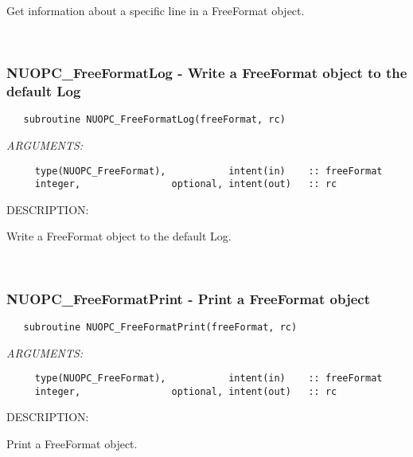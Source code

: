      Get information about a specific line in a FreeFormat object. 
 
\mbox{}\hrulefill\ 
 
\subsubsection [NUOPC\_FreeFormatLog] {NUOPC\_FreeFormatLog - Write a FreeFormat object to the default Log}


\begin{verbatim}   subroutine NUOPC_FreeFormatLog(freeFormat, rc)\end{verbatim}{\em ARGUMENTS:}
\begin{verbatim}     type(NUOPC_FreeFormat),           intent(in)    :: freeFormat
     integer,                optional, intent(out)   :: rc\end{verbatim}
{\sf DESCRIPTION:\\ }


     Write a FreeFormat object to the default Log. 
 
\mbox{}\hrulefill\ 
 
\subsubsection [NUOPC\_FreeFormatPrint] {NUOPC\_FreeFormatPrint - Print a FreeFormat object}


\begin{verbatim}   subroutine NUOPC_FreeFormatPrint(freeFormat, rc)\end{verbatim}{\em ARGUMENTS:}
\begin{verbatim}     type(NUOPC_FreeFormat),           intent(in)    :: freeFormat
     integer,                optional, intent(out)   :: rc\end{verbatim}
{\sf DESCRIPTION:\\ }


     Print a FreeFormat object.
\setlength{\parskip}{\oldparskip}
\setlength{\parindent}{\oldparindent}
\setlength{\baselineskip}{\oldbaselineskip}
